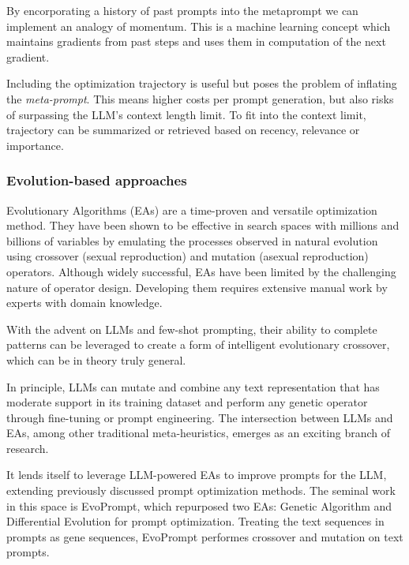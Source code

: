 By encorporating a history of past prompts into the metaprompt we can implement an analogy of momentum. 
This is a machine learning concept which maintains gradients from past steps and uses them in computation of the next gradient.

Including the optimization trajectory is useful but poses the problem of inflating the \textit{meta-prompt}. 
This means higher costs per prompt generation, but also risks of surpassing the LLM's context length limit.
To fit into the context limit, trajectory can be summarized or retrieved based on recency, relevance or importance\cite{tang2024unleashingpotentiallargelanguage}.


\subsubsection{Evolution-based approaches}
Evolutionary Algorithms (EAs) are a time-proven and versatile optimization method. 
They have been shown to be effective in search spaces with millions and billions of variables\cite{meyerson2024languagemodelcrossovervariation}
by emulating the processes observed in natural evolution using crossover (sexual reproduction) and mutation (asexual reproduction) operators.
Although widely successful, EAs have been limited by the challenging nature of operator design.
Developing them requires extensive manual work by experts with domain knowledge\cite{liu2024largelanguagemodelsevolutionary}.

With the advent on LLMs and few-shot prompting, their ability to complete patterns can be leveraged to create a form of intelligent 
evolutionary crossover\cite{meyerson2024languagemodelcrossovervariation}, which can be in theory truly general.

In principle, LLMs can mutate and combine any text representation that has moderate support in its training dataset
and perform any genetic operator through fine-tuning or prompt engineering.
The intersection between LLMs and EAs, among other traditional meta-heuristics, emerges as an exciting branch of research.

It lends itself to leverage LLM-powered EAs to improve prompts for the LLM, extending previously
discussed prompt optimization methods. The seminal work in this space is EvoPrompt\cite{guo2024connectinglargelanguagemodels},
which repurposed two EAs: Genetic Algorithm and Differential Evolution for prompt optimization. 
Treating the text sequences in prompts as gene sequences, EvoPrompt performes crossover and mutation
on text prompts. 

